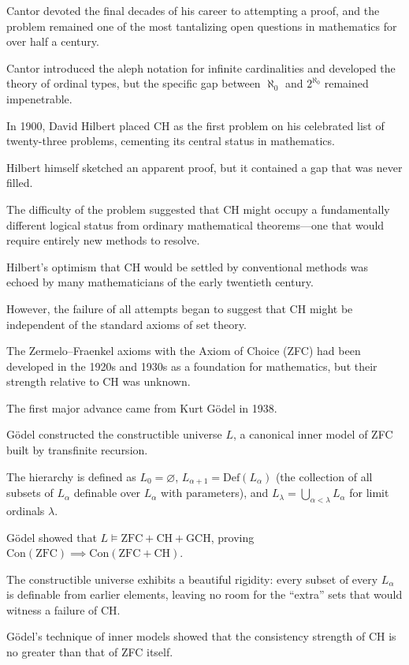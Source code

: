 Cantor devoted the final decades of his career to attempting a proof, and the problem remained one of the most tantalizing open questions in mathematics for over half a century.

Cantor introduced the aleph notation for infinite cardinalities and developed the theory of ordinal types, but the specific gap between $\aleph_0$ and $2^{\aleph_0}$ remained impenetrable.

In 1900, David Hilbert placed CH as the first problem on his celebrated list of twenty-three problems, cementing its central status in mathematics.

Hilbert himself sketched an apparent proof, but it contained a gap that was never filled.

The difficulty of the problem suggested that CH might occupy a fundamentally different logical status from ordinary mathematical theorems---one that would require entirely new methods to resolve.

Hilbert's optimism that CH would be settled by conventional methods was echoed by many mathematicians of the early twentieth century.

However, the failure of all attempts began to suggest that CH might be independent of the standard axioms of set theory.

The Zermelo--Fraenkel axioms with the Axiom of Choice (ZFC) had been developed in the 1920s and 1930s as a foundation for mathematics, but their strength relative to CH was unknown.

The first major advance came from Kurt Gödel in 1938.

Gödel constructed the constructible universe $L$, a canonical inner model of ZFC built by transfinite recursion.

The hierarchy is defined as $L_0 = \varnothing$, $L_{\alpha+1} = \text{Def}(L_\alpha)$ (the collection of all subsets of $L_\alpha$ definable over $L_\alpha$ with parameters), and $L_\lambda = \bigcup_{\alpha < \lambda} L_\alpha$ for limit ordinals $\lambda$.

Gödel showed that $L \models \text{ZFC} + \text{CH} + \text{GCH}$, proving $\text{Con}(\text{ZFC}) \implies \text{Con}(\text{ZFC} + \text{CH})$.

The constructible universe exhibits a beautiful rigidity: every subset of every $L_\alpha$ is definable from earlier elements, leaving no room for the ``extra'' sets that would witness a failure of CH.

Gödel's technique of inner models showed that the consistency strength of CH is no greater than that of ZFC itself.

